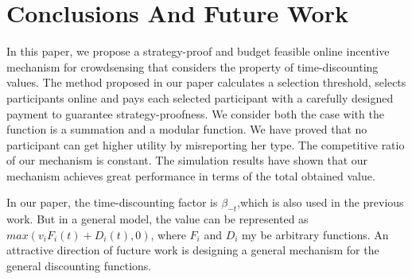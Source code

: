 \documentclass[conference,compsocconf,letterpaper,10pt]{IEEEtran}
\begin{document}
\section{Conclusions And Future Work}
In this paper, we propose a strategy-proof and budget feasible online incentive mechanism for crowdsensing that considers the property of time-discounting values. The method proposed in our paper calculates a selection threshold, selects participants online and pays each selected participant with a carefully designed payment to guarantee strategy-proofness. We consider both the case with the function is a summation and a modular function. We have proved that no participant can get higher utility by misreporting her type. The competitive ratio of our mechanism is constant. The simulation results have shown that our mechanism achieves great performance in terms of the total obtained value.

In our paper, the time-discounting factor is $\beta_{-t}$,which is also used in the previous work. But in a general model, the value can be represented as $max(v_iF_i(t)+D_i(t),0)$, where $F_i$ and $D_i$ my be arbitrary functions. An attractive direction of fucture work is designing a general mechanism for the general discounting functions.


\end{document}
